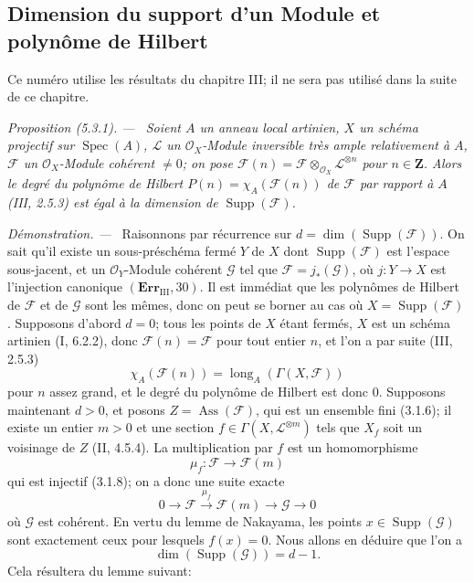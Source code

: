 \documentclass[10pt,oneside]{book}
\newcommand{\oldpage}[2][]{%
  \setcounter{footnote}{0}%
  \marginpar{\scriptsize\textbf{#1}~|~#2}\ignorespaces}
\newenvironment{proposition}[1][]{%
  \par\medskip\noindent\itshape Proposition (#1). ---\ }{\par}
\newenvironment{proof}{%
  \par\medskip\noindent\textit{Démonstration. ---\ }}{\par}
\begin{document}
\subsection{Dimension du support d'un Module et polynôme de Hilbert}
\label{IV.2.s5.3-fr}

\oldpage[IV-2]{92}

Ce numéro utilise les résultats du chapitre III; il ne sera pas utilisé dans la
suite de ce chapitre.

\begin{proposition}[5.3.1]
\label{IV.2.s5.3.1-fr}
Soient $A$ un anneau local artinien, $X$ un schéma projectif sur
$\operatorname{Spec}(A)$, $\mathcal L$ un $\mathcal O_X$-Module inversible
très ample relativement à $A$, $\mathcal F$ un $\mathcal O_X$-Module cohérent
$\ne0$; on pose
$\mathcal F(n)=\mathcal F\otimes_{\mathcal O_X}\mathcal L^{\otimes n}$ pour
$n\in\mathbf Z$. Alors le degré du polynôme de Hilbert
$P(n)=\chi_A(\mathcal F(n))$ de $\mathcal F$ par rapport à $A$ (III, 2.5.3)
est égal à la dimension de $\operatorname{Supp}(\mathcal F)$.
\end{proposition}

\begin{proof}
Raisonnons par récurrence sur
$d=\dim(\operatorname{Supp}(\mathcal F))$. On sait qu'il existe un
sous-préschéma fermé $Y$ de $X$ dont $\operatorname{Supp}(\mathcal F)$ est
l'espace sous-jacent, et un $\mathcal O_Y$-Module cohérent $\mathcal G$ tel
que $\mathcal F=j_*(\mathcal G)$, où $j:Y\to X$ est l'injection canonique
$(\mathbf{Err}_{\mathrm{III}},30)$. Il est immédiat que les polynômes de
Hilbert de $\mathcal F$ et de $\mathcal G$ sont les mêmes, donc on peut se
borner au cas où $X=\operatorname{Supp}(\mathcal F)$. Supposons d'abord
$d=0$; tous les points de $X$ étant fermés, $X$ est un schéma artinien
(I, 6.2.2), donc $\mathcal F(n)=\mathcal F$ pour tout entier $n$, et l'on a
par suite (III, 2.5.3)
\[
\chi_A(\mathcal F(n))=\operatorname{long}_A(\Gamma(X,\mathcal F))
\]
pour $n$ assez grand, et le degré du polynôme de Hilbert est donc $0$.
Supposons maintenant $d>0$, et posons
$Z=\operatorname{Ass}(\mathcal F)$, qui est un ensemble fini (3.1.6); il
existe un entier $m>0$ et une section
$f\in\Gamma(X,\mathcal L^{\otimes m})$ tels que $X_f$ soit un voisinage de
$Z$ (II, 4.5.4). La multiplication par $f$ est un homomorphisme
\[
\mu_f:\mathcal F\longrightarrow\mathcal F(m)
\]
qui est injectif (3.1.8); on a donc une suite exacte
\begin{equation}
0\longrightarrow\mathcal F\xrightarrow{\mu_f}\mathcal F(m)
\longrightarrow\mathcal G\longrightarrow0
\tag{5.3.1.1}\label{IV.2.s5.3.1.1-fr}
\end{equation}
où $\mathcal G$ est cohérent. En vertu du lemme de Nakayama, les points
$x\in\operatorname{Supp}(\mathcal G)$ sont exactement ceux pour lesquels
$f(x)=0$. Nous allons en déduire que l'on a
\begin{equation}
\dim(\operatorname{Supp}(\mathcal G))=d-1.
\tag{5.3.1.2}\label{IV.2.s5.3.1.2-fr}
\end{equation}
Cela résultera du lemme suivant:
\end{proof}
\end{document}

